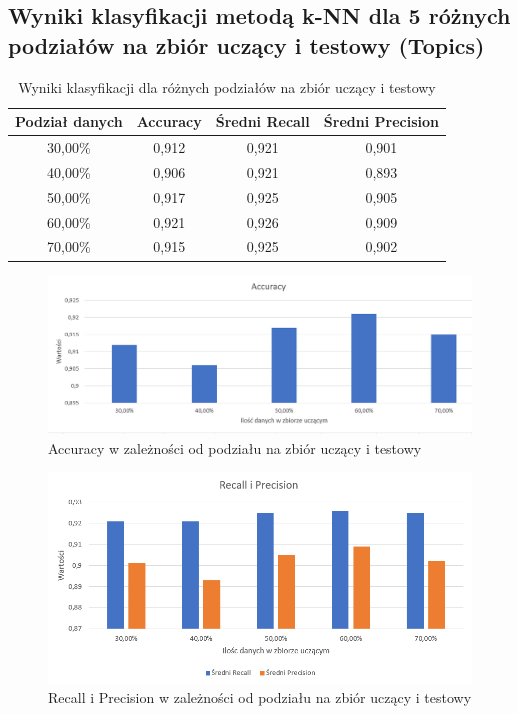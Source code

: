 \documentclass{classrep}
\begin{document}
{\subsection{Wyniki klasyfikacji metodą k-NN dla 5 różnych podziałów na zbiór uczący i testowy (Topics)}

\begin{table}[H]
\begin{center}
\caption{Wyniki klasyfikacji dla różnych podziałów na zbiór uczący i testowy}
\begin{tabular}{|c|c|c|c|}
\hline
\textbf{Podział danych} & \textbf{Accuracy} & \textbf{Średni Recall} & \textbf{Średni Precision} \\ \hline
30,00\%                 & 0,912             & 0,921                  & 0,901                     \\ \hline
40,00\%                 & 0,906             & 0,921                  & 0,893                     \\ \hline
50,00\%                 & 0,917             & 0,925                  & 0,905                     \\ \hline
60,00\%                 & 0,921             & 0,926                  & 0,909                     \\ \hline
70,00\%                 & 0,915             & 0,925                  & 0,902                     \\ \hline
\end{tabular}
\end{center}
\end{table}


\begin{figure}[H]
\caption{Accuracy w zależności od podziału na zbiór uczący i testowy}
\centering
\includegraphics[width=1\textwidth]{i11}
\end{figure}

\begin{figure}[H]
\caption{Recall i Precision w zależności od podziału na zbiór uczący i testowy}
\centering
\includegraphics[width=1\textwidth]{i12}
\end{figure}

}
\end{document}
